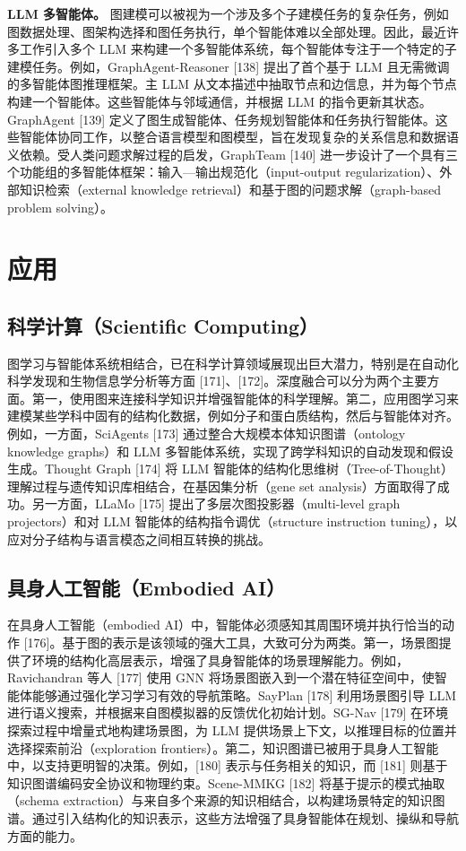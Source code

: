 \documentclass[10pt,UTF8,fontset=fandol]{ctexart}
\begin{document}
\textbf{LLM 多智能体。} 图建模可以被视为一个涉及多个子建模任务的复杂任务，例如图数据处理、图架构选择和图任务执行，单个智能体难以全部处理。因此，最近许多工作引入多个 LLM 来构建一个多智能体系统，每个智能体专注于一个特定的子建模任务。例如，GraphAgent-Reasoner [138] 提出了首个基于 LLM 且无需微调的多智能体图推理框架。主 LLM 从文本描述中抽取节点和边信息，并为每个节点构建一个智能体。这些智能体与邻域通信，并根据 LLM 的指令更新其状态。GraphAgent [139] 定义了图生成智能体、任务规划智能体和任务执行智能体。这些智能体协同工作，以整合语言模型和图模型，旨在发现复杂的关系信息和数据语义依赖。受人类问题求解过程的启发，GraphTeam [140] 进一步设计了一个具有三个功能组的多智能体框架：输入—输出规范化（input-output regularization）、外部知识检索（external knowledge retrieval）和基于图的问题求解（graph-based problem solving）。

\section{应用}

\subsection{科学计算（Scientific Computing）}

图学习与智能体系统相结合，已在科学计算领域展现出巨大潜力，特别是在自动化科学发现和生物信息学分析等方面 [171]、[172]。深度融合可以分为两个主要方面。第一，使用图来连接科学知识并增强智能体的科学理解。第二，应用图学习来建模某些学科中固有的结构化数据，例如分子和蛋白质结构，然后与智能体对齐。例如，一方面，SciAgents [173] 通过整合大规模本体知识图谱（ontology knowledge graphs）和 LLM 多智能体系统，实现了跨学科知识的自动发现和假设生成。Thought Graph [174] 将 LLM 智能体的结构化思维树（Tree-of-Thought）理解过程与遗传知识库相结合，在基因集分析（gene set analysis）方面取得了成功。另一方面，LLaMo [175] 提出了多层次图投影器（multi-level graph projectors）和对 LLM 智能体的结构指令调优（structure instruction tuning），以应对分子结构与语言模态之间相互转换的挑战。

\subsection{具身人工智能（Embodied AI）}

在具身人工智能（embodied AI）中，智能体必须感知其周围环境并执行恰当的动作 [176]。基于图的表示是该领域的强大工具，大致可分为两类。第一，场景图提供了环境的结构化高层表示，增强了具身智能体的场景理解能力。例如，Ravichandran 等人 [177] 使用 GNN 将场景图嵌入到一个潜在特征空间中，使智能体能够通过强化学习学习有效的导航策略。SayPlan [178] 利用场景图引导 LLM 进行语义搜索，并根据来自图模拟器的反馈优化初始计划。SG-Nav [179] 在环境探索过程中增量式地构建场景图，为 LLM 提供场景上下文，以推理目标的位置并选择探索前沿（exploration frontiers）。第二，知识图谱已被用于具身人工智能中，以支持更明智的决策。例如，[180] 表示与任务相关的知识，而 [181] 则基于知识图谱编码安全协议和物理约束。Scene-MMKG [182] 将基于提示的模式抽取（schema extraction）与来自多个来源的知识相结合，以构建场景特定的知识图谱。通过引入结构化的知识表示，这些方法增强了具身智能体在规划、操纵和导航方面的能力。
\end{document}
